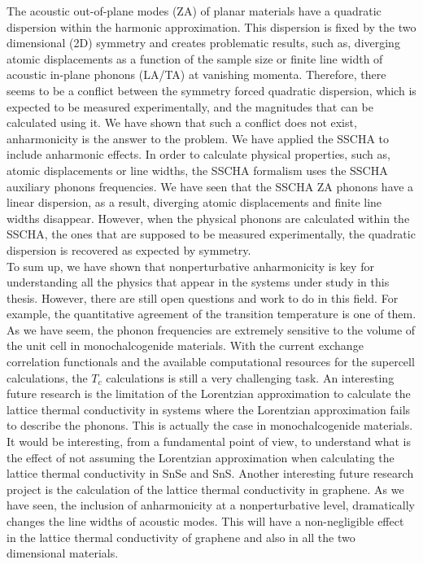 The acoustic out-of-plane modes (ZA) of planar materials have a quadratic dispersion within the harmonic 
approximation. This dispersion is fixed by the two dimensional (2D) symmetry and creates problematic 
results, such as, diverging atomic displacements as a function of the sample size or finite line width of acoustic 
in-plane phonons (LA/TA) at vanishing momenta. Therefore, there seems to be a conflict between the symmetry forced 
quadratic dispersion, which is expected to be measured experimentally, and the magnitudes that can be calculated 
using it. We have shown that such a conflict does not exist, anharmonicity is the answer to the problem. We have 
applied the SSCHA to include anharmonic effects. In order to calculate physical properties, such as, atomic 
displacements or line widths, the SSCHA formalism uses the SSCHA auxiliary phonons frequencies. We have seen that 
the SSCHA ZA phonons have a linear dispersion, as a result, diverging atomic displacements and finite line widths 
disappear. However, when the physical phonons are calculated within the SSCHA, the ones that are supposed to be 
measured experimentally, the quadratic dispersion is recovered as expected by symmetry. \\

To sum up, we have shown that nonperturbative anharmonicity is key for understanding all the physics that appear 
in the systems under study in this thesis. However, there are still open questions and work to do in this field. For 
example, the quantitative agreement of the transition temperature is one of them. As we have seem, the phonon 
frequencies are extremely sensitive to the volume of the unit cell in monochalcogenide materials. With the current 
exchange correlation functionals and the available computational resources for the supercell calculations, the 
$T_{c}$ calculations is still a very challenging task. An interesting future research is the limitation of the 
Lorentzian approximation to calculate the lattice thermal conductivity in systems where the Lorentzian approximation
fails to describe the phonons. This is actually the case in monochalcogenide materials. It would be interesting, from 
a fundamental point of view, to understand what is the effect of not assuming the Lorentzian approximation when 
calculating the lattice thermal conductivity in SnSe and SnS. Another interesting future research project is the 
calculation of the lattice thermal conductivity in graphene. As we have seen, the inclusion of anharmonicity at 
a nonperturbative level, dramatically changes the line widths of acoustic modes. This will have a non-negligible 
effect in the lattice thermal conductivity of graphene and also in all the two dimensional materials.

